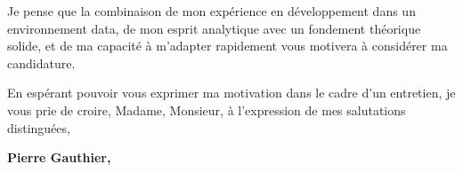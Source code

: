 \documentclass{cv_style}
\begin{document}
Je pense que la combinaison de mon expérience en développement dans un environnement data, de mon esprit analytique avec un fondement théorique solide, et de ma capacité à m'adapter rapidement vous motivera à considérer ma candidature.

En espérant pouvoir vous exprimer ma motivation dans le cadre d’un entretien,
je vous prie de croire, Madame, Monsieur, à l’expression de mes salutations
distinguées, 

\vspace{0.0cm}
\begin{flushright}
\parbox{5cm}{
\centering
    \textbf{Pierre Gauthier,}\\
}
\end{flushright}
\end{document}
